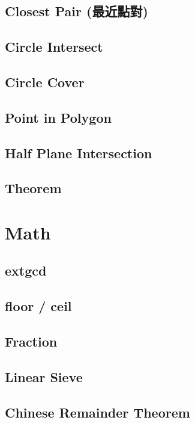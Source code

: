 \subsection{Closest Pair (最近點對)}

\subsection{Circle Intersect}

\subsection{Circle Cover}

\subsection{Point in Polygon}

\subsection{Half Plane Intersection}

\subsection{Theorem}


\section{Math}
\subsection{extgcd}

\subsection{floor / ceil}

\subsection{Fraction}

\subsection{Linear Sieve}

\subsection{Chinese Remainder Theorem}

